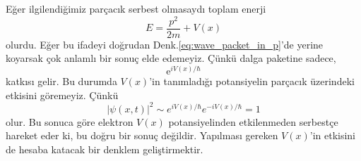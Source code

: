 \documentclass[00_kitap.tex]{subfiles}
\begin{document}
Eğer ilgilendiğimiz parçacık serbest olmasaydı toplam enerji
\begin{equation}
E=\dfrac {p^{2}}{2m} + V(x)
\label{eq:non_free_particle_E}
\end{equation}
olurdu.  Eğer bu ifadeyi doğrudan Denk.\ref{eq:wave_packet_in_p}'de yerine koyarsak çok anlamlı bir sonuç elde edemeyiz.  Çünkü dalga paketine sadece,
\begin{equation*}
\text{e}^{iV\left( x\right) /\hbar }
\end{equation*}
katkısı gelir.  Bu durumda $V(x)$'in  tanımladığı potansiyelin parçacık üzerindeki etkisini göremeyiz.  Çünkü
\begin{equation*}
\left| \psi \left( x,t\right) \right| ^{2}\sim e^{iV\left( x\right) /\hbar }e^{-iV\left( x\right) /\hbar }=1
\end{equation*}
olur. Bu sonuca göre elektron $V(x)$  potansiyelinden  etkilenmeden serbestçe hareket eder ki,  bu doğru bir  sonuç değildir. Yapılması gereken $V(x)$'in etkisini de hesaba katacak bir denklem geliştirmektir.
\end{document}
